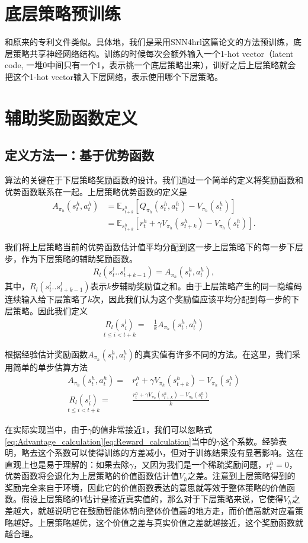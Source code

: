 \section{底层策略预训练}
和原来的专利文件类似。具体地，我们是采用SNN4hrl这篇论文的方法预训练，底层策略共享神经网络结构。训练的时候每次会额外输入一个1-hot vector（latent code, 一堆0中间只有一个1，表示挑一个底层策略出来），训好之后上层策略就会把这个1-hot vector输入下层网络，表示使用哪个下层策略。

\section{辅助奖励函数定义}
\subsection{定义方法一：基于优势函数}
算法的关键在于下层策略奖励函数的设计。我们通过一个简单的定义将奖励函数和优势函数联系在一起。上层策略优势函数的定义是
	\begin{align}
	A_{\pi_h}(s_t^h, a_t^h)&=\mathbb{E}_{s_{t+k}^h}[Q_{\pi_h}(s_t^h, a_t^h)-V_{\pi_h}(s_t^h)]\\
	&= \mathbb{E}_{s_{t+k}^h}[r_t^h+\gamma V_{\pi_h}(s_{t+k}^h)-V_{\pi_h}(s_t^h)].
	\end{align}
	
我们将上层策略当前的优势函数估计值平均分配到这一步上层策略下的每一步下层步，作为下层策略的辅助奖励函数。
	\begin{align}
	R_l(s_t^l..s_{t+k-1}^l)=A_{\pi_h}(s_t^h,a_t^h),
	\end{align}
其中，$R_l(s_t^l..s_{t+k-1}^l)$表示$k$步辅助奖励值之和。由于上层策略产生的同一隐编码连续输入给下层策略了$k$次，因此我们认为这个奖励值应该平均分配到每一步的下层策略。因此我们定义
	\begin{align}
	\underset{t\leq  i < t+k}{R_l(s_i^l)}=&\frac{1}{k} A_{\pi_h}(s_t^h,a_t^h)
	\end{align}

根据经验估计奖励函数$A_{\pi_h}(s_t^h, a_t^h)$的真实值有许多不同的方法\cite{GAE}。在这里，我们采用简单的单步估算方法
	\begin{align}
	A_{\pi_h}(s_t^h, a_t^h)=&r_t^h+\gamma V_{\pi_h}(s_{t+k}^h)-V_{\pi_h}(s_t^h)
	\label{eq:Advantage_calculation}
	\\
	\underset{t\leq  i < t+k}{R_l(s_i^l)}=&\frac{r_t^h+\gamma V_{\pi_h}(s_{t+k}^h)-V_{\pi_h}(s_t^h)}{k}
	\label{eq:Reward_calculation}
	\end{align}

在实际实现当中，由于$\gamma$的值非常接近$1$，我们可以忽略式\eqref{eq:Advantage_calculation}\eqref{eq:Reward_calculation}当中的$\gamma$这个系数。经验表明，略去这个系数可以使得训练的方差减小，但对于训练结果没有显著影响。这在直观上也是易于理解的：如果去除$\gamma$，又因为我们是一个稀疏奖励问题，$r_t^h = 0$，优势函数将会退化为上层策略的价值函数估计值$V_h$之差。注意到上层策略得到的奖励完全来自于环境，因此它的价值函数表达的意思就等效于整体策略的价值函数。假设上层策略的$V$估计是接近真实值的，那么对于下层策略来说，它使得$V_h$之差越大，就越说明它在鼓励智能体朝向整体价值高的地方走，而价值高就对应着策略越好。上层策略越优，这个价值之差与真实价值之差就越接近，这个奖励函数就越合理。

